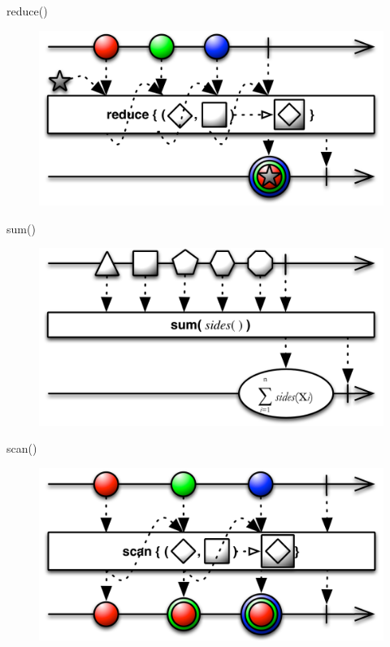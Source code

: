 \begin{frame}{reduce()}
	\begin{figure}[h]
		\includegraphics[width=1.0\textwidth,page=1]{gfx/reduce}
	\end{figure}
\end{frame}

\begin{frame}{sum()}
	\begin{figure}[h]
		\includegraphics[width=1.0\textwidth,page=1]{gfx/sum}
	\end{figure}
\end{frame}

\begin{frame}{scan()}
	\begin{figure}[h]
		\includegraphics[width=1.0\textwidth,page=1]{gfx/scan}
	\end{figure}
\end{frame}
